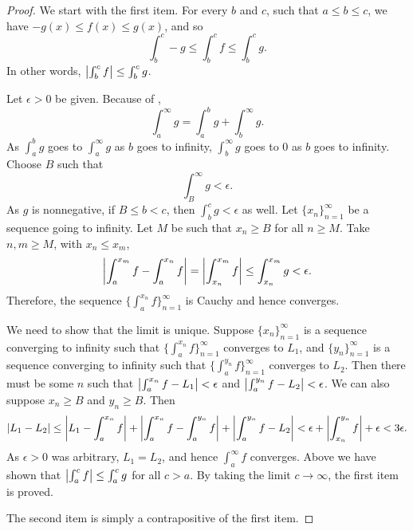 \begin{proof}
We start with the first item.
For every $b$ and $c$, such that $a \leq b \leq c$, we have 
$-g(x) \leq f(x) \leq g(x)$, and so
\begin{equation*}
\int_b^c -g \leq \int_b^c f \leq \int_b^c g  .
\end{equation*}
In other words, $\left\lvert {\int_b^c f} \right\rvert \leq \int_b^c g$.

Let $\epsilon > 0$ be given.  Because
of ,
\begin{equation*}
\int_a^\infty g =
\int_a^b g +
\int_b^\infty g .
\end{equation*}
As $\int_a^b g$ goes to
$\int_a^\infty g$ as $b$ goes to infinity,
$\int_b^\infty g$ goes to 0 as $b$ goes to infinity.  Choose $B$
such that
\begin{equation*}
\int_B^\infty g < \epsilon .
\end{equation*}
As $g$ is nonnegative, if $B \leq b < c$, then
$\int_b^c g < \epsilon$ as well.
Let $\{ x_n \}_{n=1}^\infty$ be a sequence going to infinity.  Let $M$ be such that
$x_n \geq B$ for all $n \geq M$.  Take $n, m \geq M$,
with $x_n \leq x_m$,
\begin{equation*}
\left\lvert {\int_a^{x_m} f - \int_a^{x_n} f} \right\rvert 
=
\left\lvert {\int_{x_n}^{x_m} f} \right\rvert 
\leq \int_{x_n}^{x_m} g < \epsilon .
\end{equation*}
Therefore, the sequence $\bigl\{ \int_a^{x_n} f \bigr\}_{n=1}^\infty$ is Cauchy and hence converges.

We need to show that the limit is unique.  Suppose $\{ x_n \}_{n=1}^\infty$ is a sequence
converging to infinity such that
$\bigl\{ \int_a^{x_n} f \bigr\}_{n=1}^\infty$ converges to $L_1$, and $\{
y_n \}_{n=1}^\infty$ is a sequence
converging to infinity such that
$\bigl\{ \int_a^{y_n} f \bigr\}_{n=1}^\infty$ converges to $L_2$.  Then there must be some $n$ such
that
$\bigl\lvert {\int_a^{x_n} f - L_1} \bigr\rvert < \epsilon$ and 
$\bigl\lvert {\int_a^{y_n} f - L_2} \bigr\rvert < \epsilon$.  We can also suppose $x_n \geq B$
and $y_n \geq B$.  Then
\begin{equation*}
\lvert {L_1 - L_2} \rvert \leq
\left\lvert {L_1 - \int_a^{x_n} f} \right\rvert
+
\left\lvert {\int_a^{x_n} f- \int_a^{y_n} f} \right\rvert
+
\left\lvert {\int_a^{y_n} f - L_2} \right\rvert
<
\epsilon
+
\left\lvert {\int_{x_n}^{y_n} f} \right\rvert
+
\epsilon
<
3 \epsilon.
\end{equation*}
As $\epsilon > 0$ was arbitrary, $L_1 = L_2$, and hence
$\int_a^\infty f$ converges.
Above we have shown that $\left\lvert {\int_a^c f} \right\rvert \leq \int_a^c g$ for all $c > a$.
By taking the limit $c \to \infty$, the first item is proved.

The second item is simply a contrapositive of the first item.
\end{proof}

